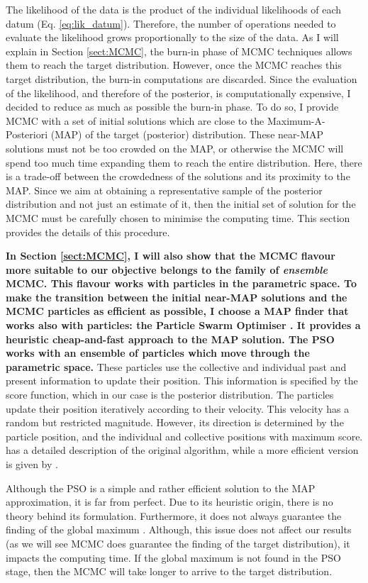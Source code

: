 The likelihood of the data is the product of the individual likelihoods of each datum (Eq. \ref{eq:lik_datum}). Therefore, the number of operations needed to evaluate the likelihood grows proportionally to the size of the data. As I will explain in Section \ref{sect:MCMC}, the burn-in phase of MCMC techniques allows them to reach the target distribution. However, once the MCMC reaches this target distribution, the burn-in computations are discarded. Since the evaluation of the likelihood, and therefore of the posterior, is computationally expensive, I decided to reduce as much as possible the burn-in phase. To do so, I provide MCMC with a set of initial solutions which are close to the Maximum-A-Posteriori (MAP) of the target (posterior) distribution. These near-MAP solutions must not be too crowded on the MAP, or otherwise the MCMC will spend too much time expanding them to reach the entire distribution. Here, there is a trade-off between the crowdedness of the solutions and its proximity to the MAP. Since we aim at obtaining a representative sample of the posterior distribution and not just an estimate of it, then the initial set of solution for the MCMC must be carefully chosen to minimise the computing time. This section provides the details of this procedure. 

\textbf{In Section \ref{sect:MCMC}, I will also show that the MCMC flavour more suitable to our objective belongs to the family of \emph{ensemble} MCMC. This flavour works with particles in the parametric space. To make the transition between the initial near-MAP solutions and the  MCMC particles as efficient as possible, I choose a MAP finder that works also with particles: the Particle Swarm Optimiser \cite[PSO,][]{Kennedy1995}. It provides a heuristic cheap-and-fast approach to the MAP solution. The PSO works with an ensemble of particles which move through the parametric space.} These particles use the collective and individual past and present information to update their position. This information is specified by the score function, which in our case is the posterior distribution. The particles update their position iteratively according to their velocity. This velocity has a random but restricted magnitude. However, its direction is determined by the particle position, and the individual and collective positions with maximum score. \citet{Kennedy1995} has a detailed description of the original algorithm, while a more efficient version is given by \citep{Clerc2002}.

Although the PSO is a simple and rather efficient solution to the MAP approximation, it is far from perfect. Due to its heuristic origin, there is no theory behind its formulation. Furthermore, it does not always guarantee the finding of the global maximum \cite[for a convergence guaranteed version see][]{Patel2013}. Although,  this issue does not affect our results (as we will see MCMC does guarantee the finding of the target distribution), it impacts the computing time. If the global maximum is not found in the PSO stage, then the MCMC will take longer to arrive to the target distribution. 

